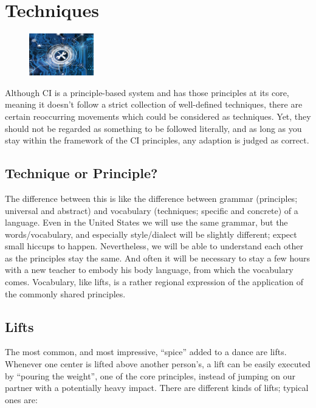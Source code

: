 \section{Techniques}\label{sec:techniques}

\begin{figure}
    \centering
    \includegraphics[width=0.25\textwidth]{images/techniques}
\end{figure}

Although CI is a principle-based system and has those principles at its core, meaning it doesn't follow a strict collection of well-defined techniques, there are certain reoccurring movements which could be considered as techniques.
Yet, they should not be regarded as something to be followed literally, and as long as you stay within the framework of the CI principles, any adaption is judged as correct.

\subsection{Technique or Principle?}\label{subsec:technique-or-principle?}

The difference between this is like the difference between grammar (principles; universal and abstract) and vocabulary (techniques; specific and concrete) of a language.
Even in the United States we will use the same grammar, but the words/vocabulary, and especially style/dialect will be slightly different; expect small hiccups to happen.
Nevertheless, we will be able to understand each other as the principles stay the same.
And often it will be necessary to stay a few hours with a new teacher to embody his body language, from which the vocabulary comes.
Vocabulary, like lifts, is a rather regional expression of the application of the commonly shared principles.

\subsection{Lifts}\label{subsec:lifts}

The most common, and most impressive, ``spice'' added to a dance are lifts.
Whenever one center is lifted above another person's, a lift can be easily executed by ``pouring the weight'', one of the core principles, instead of jumping on our partner with a potentially heavy impact.
There are different kinds of lifts; typical ones are:

